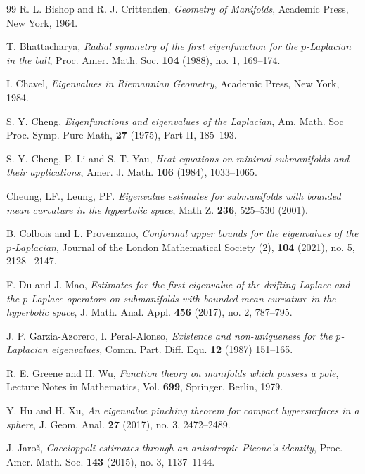 \documentclass{article}
\begin{document}
\begin{thebibliography}{99}
 R. L. Bishop and R. J. Crittenden, \emph{Geometry of Manifolds}, Academic Press, New York, 1964.

T. Bhattacharya,
\emph{Radial symmetry of the first eigenfunction for the {$p$}-Laplacian in the ball},
Proc. Amer. Math. Soc. \textbf{104} (1988), no. 1, 169--174.

 I. Chavel, \emph{Eigenvalues in Riemannian Geometry}, \newblock Academic Press, New York, 1984.

 S. Y. Cheng, \emph{Eigenfunctions and eigenvalues of the Laplacian}, Am. Math. Soc Proc. Symp. Pure
Math, \textbf{27} (1975), Part II, 185--193.


 S. Y. Cheng, P. Li and S. T. Yau, \emph{Heat equations on minimal submanifolds and their applications}, Amer. J. Math. \textbf{106} (1984), 1033--1065.

 Cheung, LF., Leung, PF. {\em  Eigenvalue estimates for submanifolds with bounded mean curvature in the hyperbolic space}, Math Z. \textbf{236}, 525--530 (2001).

 B. Colbois and L. Provenzano, {\em Conformal upper bounds for the eigenvalues of the $p$‑Laplacian}, Journal of the London Mathematical Society (2), \textbf{104} (2021), no. 5, 2128–-2147. 


 F. Du and J. Mao, \emph{Estimates for the first eigenvalue of the drifting Laplace and the $p$-Laplace operators on submanifolds with bounded mean curvature in the hyperbolic space}, J. Math. Anal. Appl. {\bf 456} (2017), no. 2, 787--795.

 J. P. Garzia-Azorero, I. Peral-Alonso, {\em Existence and non-uniqueness for the $p$-Laplacian eigenvalues}, Comm. Part. Diff. Equ. \textbf{12} (1987) 151--165.

 R. E. Greene and H. Wu, \emph{Function theory on manifolds which possess a pole}, Lecture Notes in Mathematics, Vol. \textbf{699}, Springer, Berlin, 1979.


 Y. Hu and H. Xu, \emph{An eigenvalue pinching theorem for compact hypersurfaces in a sphere}, J. Geom. Anal. \textbf{27} (2017), no. 3, 2472--2489.

J. Jaro\v{s}, \emph{Caccioppoli estimates through an anisotropic Picone's identity}, Proc. Amer. Math. Soc. \textbf{143} (2015), no. 3, 1137--1144.


\end{thebibliography}
\end{document}
